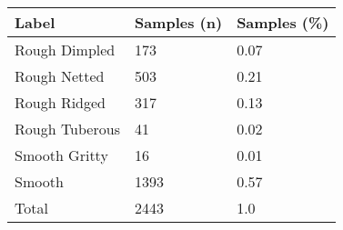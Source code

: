 \begin{tabular}{lll}
\toprule
Label & Samples (n) & Samples (\%) \\
\midrule
Rough Dimpled  &         173 &        0.07 \\
Rough Netted   &         503 &        0.21 \\
Rough Ridged   &         317 &        0.13 \\
Rough Tuberous &          41 &        0.02 \\
Smooth Gritty  &          16 &        0.01 \\
Smooth         &        1393 &        0.57 \\
Total          &        2443 &         1.0 \\
\bottomrule
\end{tabular}
